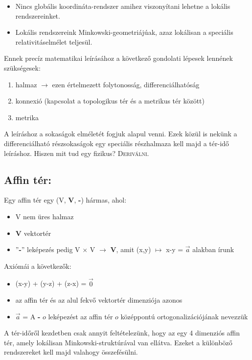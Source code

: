 \documentclass[a4paper,12pt]{article}
\begin{document}
\begin{itemize}
\item Nincs globális koordináta-rendszer amihez viszonyítani lehetne a lokális rendszereinket.
\item Lokális rendszereink Minkowski-geometriájúak, azaz lokálisan a speciális relativitáselmélet teljesül.
\end{itemize}
\par
Ennek precíz matematikai leírásához a következő gondolati lépesek lennének szükségesek:
\begin{enumerate}
\item halmaz $\rightarrow$ ezen értelmezett folytonosság, differenciálhatóság
\item konnexió (kapcsolat a topologikus tér és a metrikus tér között)
\item metrika
\end{enumerate}
A leíráshoz a sokaságok elméletét fogjuk alapul venni. Ezek közül is nekünk a differenciálható részsokaságok egy speciális részhalmaza kell majd a tér-idő leíráshoz. Hiszen mit tud egy fizikus? \textsc{Deriválni.}
\subsection{ Affin tér:}
Egy affin tér egy (V, \textbf{V}, \textbf{-}) hármas, ahol:
\begin{itemize}
\item V nem üres halmaz
\item \textbf{V} vektortér
\item ''\textbf{-}'' leképezés pedig V  $\times$ V $\rightarrow$ \textbf{V}, amit (x,y) $\mapsto$ x-y = $\vec{a}$ alakban írunk
\end{itemize}
Axiómái a következők:
\begin{itemize}
\item (x-y) + (y-z) + (z-x) = $\vec{0}$
\item az affin tér és az alul fekvő vektortér dimenziója azonos
\item $\vec{a}$ = A \textbf{-} $o$ leképezést az affin tér $o$ középpontú ortogonalizációjának nevezzük
\end{itemize}
A tér-időről kezdetben csak annyit feltételezünk, hogy az egy 4 dimenziós affin tér, amely lokálisan Minkowski-struktúrával van ellátva. Ezeket a különböző rendszereket kell majd valahogy összefésülni.
\end{document}
